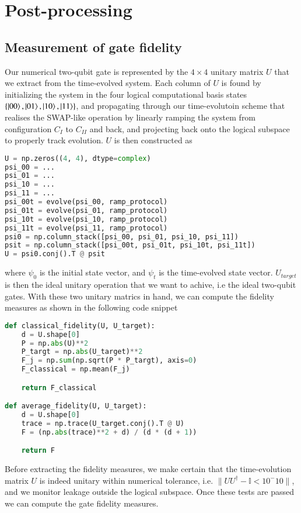 \documentclass{subfiles}
\begin{document}
\section{Post-processing}\label{sec:postprocessing}

\subsection{Measurement of gate fidelity}
Our numerical two-qubit gate is represented by the $4\times 4$ unitary matrix $U$ that we extract from the time-evolved system. Each column of $U$ is found by initializing the system in the four logical computational basis states $\{\ket{00}, \ket{01}, \ket{10}, \ket{11} \}$, and propagating through our time-evolutoin scheme that realises the SWAP-like operation by linearly ramping the system from configuration $C_I$ to $C_{II}$ and back, and projecting back onto the logical subspace to properly track evolution. $U$ is then constructed as
\begin{lstlisting}[language=Python]
U = np.zeros((4, 4), dtype=complex)
psi_00 = ...
psi_01 = ...
psi_10 = ...
psi_11 = ...
psi_00t = evolve(psi_00, ramp_protocol)
psi_01t = evolve(psi_01, ramp_protocol)
psi_10t = evolve(psi_10, ramp_protocol)
psi_11t = evolve(psi_11, ramp_protocol)
psi0 = np.column_stack([psi_00, psi_01, psi_10, psi_11])
psit = np.column_stack([psi_00t, psi_01t, psi_10t, psi_11t])
U = psi0.conj().T @ psit
\end{lstlisting}
where $\psi_0$ is the initial state vector, and $\psi_t$ is the time-evolved state vector. $U_{target}$ is then the ideal unitary operation that we want to achive, i.e the ideal two-qubit gates. With these two unitary matrics in hand, we can compute the fidelity measures as shown in the following code snippet 
\begin{lstlisting}[language=Python]
def classical_fidelity(U, U_target):
    d = U.shape[0]
    P = np.abs(U)**2
    P_targt = np.abs(U_target)**2
    F_j = np.sum(np.sqrt(P * P_targt), axis=0)
    F_classical = np.mean(F_j)

    return F_classical

def average_fidelity(U, U_target):
    d = U.shape[0]
    trace = np.trace(U_target.conj().T @ U)
    F = (np.abs(trace)**2 + d) / (d * (d + 1))

    return F
\end{lstlisting}
Before extracting the fidelity measures, we make certain that the time-evolution matrix $U$ is indeed unitary within numerical tolerance, i.e. $\|U U^\dagger - \mathbb{I} < 10^-{10}\|$, and we monitor leakage outside the logical subspace. Once these tests are passed we can compute the gate fidelity measures.
\end{document}
